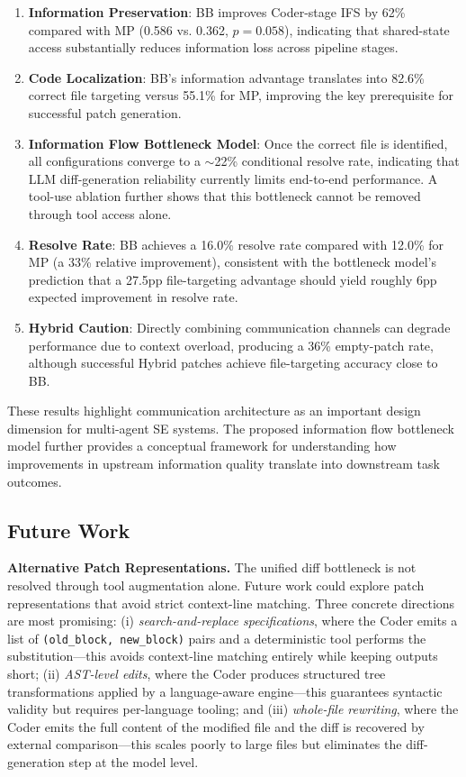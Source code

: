 \documentclass{ieeeaccess}
\begin{document}
\begin{enumerate}
\item \textbf{Information Preservation}: BB improves Coder-stage IFS by 62\% compared with MP (0.586 vs. 0.362, $p = 0.058$), indicating that shared-state access substantially reduces information loss across pipeline stages.

\item \textbf{Code Localization}: BB's information advantage translates into 82.6\% correct file targeting versus 55.1\% for MP, improving the key prerequisite for successful patch generation.

\item \textbf{Information Flow Bottleneck Model}: Once the correct file is identified, all configurations converge to a $\sim$22\% conditional resolve rate, indicating that LLM diff-generation reliability currently limits end-to-end performance. A tool-use ablation further shows that this bottleneck cannot be removed through tool access alone.

\item \textbf{Resolve Rate}: BB achieves a 16.0\% resolve rate compared with 12.0\% for MP (a 33\% relative improvement), consistent with the bottleneck model's prediction that a 27.5pp file-targeting advantage should yield roughly 6pp expected improvement in resolve rate.

\item \textbf{Hybrid Caution}: Directly combining communication channels can degrade performance due to context overload, producing a 36\% empty-patch rate, although successful Hybrid patches achieve file-targeting accuracy close to BB.

\end{enumerate}
These results highlight communication architecture as an important design dimension for multi-agent SE systems. The proposed information flow bottleneck model further provides a conceptual framework for understanding how improvements in upstream information quality translate into downstream task outcomes.

\subsection{Future Work}

\textbf{Alternative Patch Representations.} The unified diff bottleneck is not resolved through tool augmentation alone. Future work could explore patch representations that avoid strict context-line matching. Three concrete directions are most promising: (i) \emph{search-and-replace specifications}, where the Coder emits a list of \texttt{(old\_block, new\_block)} pairs and a deterministic tool performs the substitution---this avoids context-line matching entirely while keeping outputs short; (ii) \emph{AST-level edits}, where the Coder produces structured tree transformations applied by a language-aware engine---this guarantees syntactic validity but requires per-language tooling; and (iii) \emph{whole-file rewriting}, where the Coder emits the full content of the modified file and the diff is recovered by external comparison---this scales poorly to large files but eliminates the diff-generation step at the model level.
\end{document}
